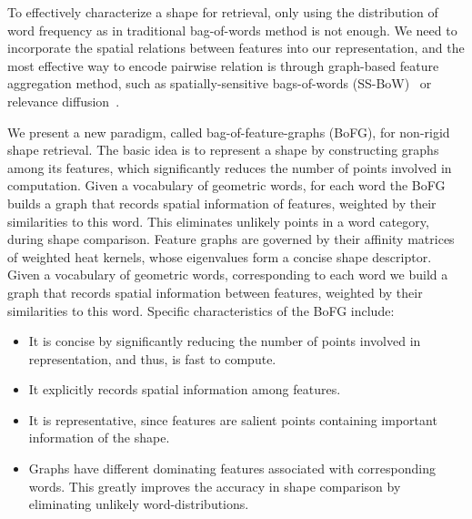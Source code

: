 
To effectively characterize a shape for retrieval, only using the distribution of word frequency as in
traditional bag-of-words method is not enough. We need to incorporate the spatial relations
between features into our representation, and the most effective way to encode pairwise
relation is through graph-based feature aggregation method, such as spatially-sensitive
bags-of-words (SS-BoW)~\cite{Bronstein2011} or relevance diffusion~\cite{Furuya2015}.

We present a new paradigm, called bag-of-feature-graphs (BoFG), for non-rigid shape retrieval.
The basic idea is to represent a shape by constructing graphs among its features, which significantly
reduces the number of points involved in computation. Given a vocabulary of geometric words, for each
word the BoFG builds a graph that records spatial information of features, weighted by their similarities
to this word. This eliminates unlikely points in a word category, during shape comparison. Feature graphs
are governed by their affinity matrices of weighted heat kernels, whose eigenvalues form a concise shape
descriptor. Given a vocabulary of geometric words, corresponding to each word we build a graph that records
spatial information between features, weighted by their similarities to this word. Specific characteristics
of the BoFG include:

\begin{itemize}
\item It is concise by significantly reducing the number of points involved in
      representation, and thus, is fast to compute.
\item It explicitly records spatial information among features.
\item It is representative, since features are salient points containing
      important information of the shape.
\item Graphs have different dominating features associated with corresponding
      words. This greatly improves the accuracy in shape comparison by
      eliminating unlikely word-distributions.
\end{itemize}

